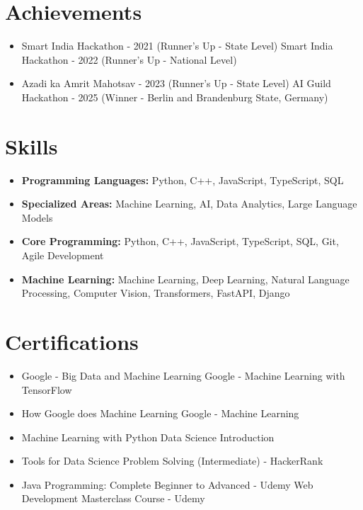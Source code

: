\documentclass[a4paper,10pt]{article}
\begin{document}
\section*{Achievements}
\begin{itemize}
\item Smart India Hackathon - 2021 (Runner's Up - State Level) \hfill Smart India Hackathon - 2022 (Runner's Up - National Level)
\item Azadi ka Amrit Mahotsav - 2023 (Runner's Up - State Level) \hfill AI Guild Hackathon - 2025 (Winner - Berlin and Brandenburg State, Germany)
\end{itemize}

\section*{Skills}
\begin{itemize}
  \item \textbf{Programming Languages:} Python, C++, JavaScript, TypeScript, SQL
  \item \textbf{Specialized Areas:} Machine Learning, AI, Data Analytics, Large Language Models
  \item \textbf{Core Programming:} Python, C++, JavaScript, TypeScript, SQL, Git, Agile Development
  \item \textbf{Machine Learning:} Machine Learning, Deep Learning, Natural Language Processing, Computer Vision, Transformers, FastAPI, Django
\end{itemize}

\section*{Certifications}
\begin{itemize}
\item Google - Big Data and Machine Learning \hfill Google - Machine Learning with TensorFlow
\item How Google does Machine Learning \hfill Google - Machine Learning
\item Machine Learning with Python \hfill Data Science Introduction
\item Tools for Data Science \hfill Problem Solving (Intermediate) - HackerRank
\item Java Programming: Complete Beginner to Advanced - Udemy \hfill Web Development Masterclass Course - Udemy
\end{itemize}
\end{document}
